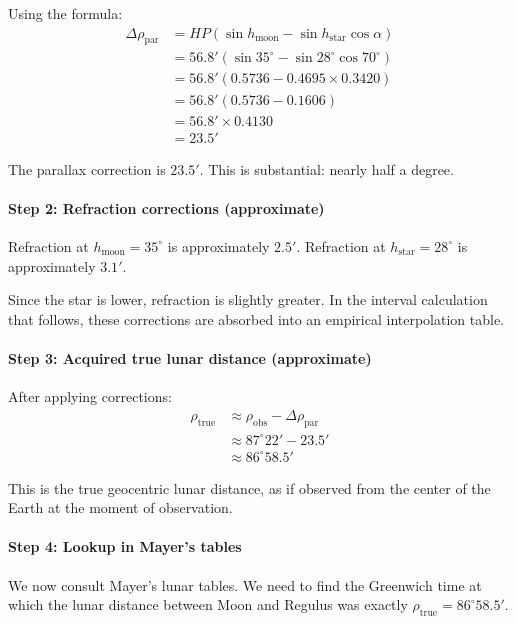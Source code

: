 Using the formula:
\begin{align}
\Delta\rho_{\text{par}} &= HP(\sin h_{\text{moon}} - \sin h_{\text{star}} \cos \alpha) \\
&= 56.8' \left( \sin 35^{\circ} - \sin 28^{\circ} \cos 70^{\circ} \right) \\
&= 56.8' \left( 0.5736 - 0.4695 \times 0.3420 \right) \\
&= 56.8' \left( 0.5736 - 0.1606 \right) \\
&= 56.8' \times 0.4130 \\
&= 23.5'
\end{align}

The parallax correction is $23.5'$. This is substantial: nearly half a degree.

\paragraph{Step 2: Refraction corrections (approximate)}

Refraction at $h_{\text{moon}} = 35^{\circ}$ is approximately $2.5'$.
Refraction at $h_{\text{star}} = 28^{\circ}$ is approximately $3.1'$.

Since the star is lower, refraction is slightly greater. In the interval calculation that follows, these corrections are absorbed into an empirical interpolation table.

\paragraph{Step 3: Acquired true lunar distance (approximate)}

After applying corrections:
\begin{align}
\rho_{\text{true}} &\approx \rho_{\text{obs}} - \Delta\rho_{\text{par}} \\
&\approx 87^{\circ} 22' - 23.5' \\
&\approx 86^{\circ} 58.5'
\end{align}

This is the true geocentric lunar distance, as if observed from the center of the Earth at the moment of observation.

\paragraph{Step 4: Lookup in Mayer's tables}

We now consult Mayer's lunar tables. We need to find the Greenwich time at which the lunar distance between Moon and Regulus was exactly $\rho_{\text{true}} = 86^{\circ} 58.5'$.

